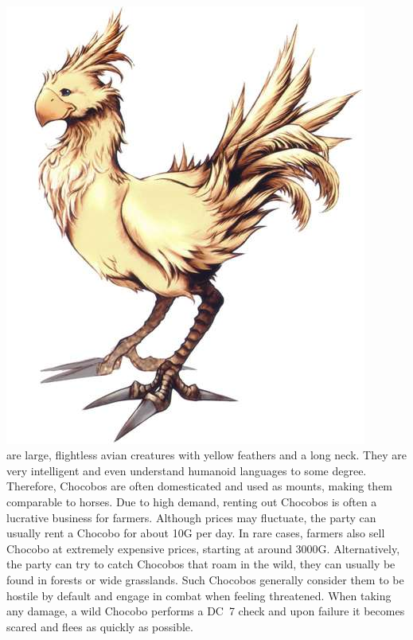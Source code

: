 %

\\
%
\includegraphics[width=0.95\columnwidth]{./art/chocobo/chocobo.jpg}
%
\\
%
%
 are large, flightless avian creatures with yellow feathers and a long neck.
They are very intelligent and even understand humanoid languages to some degree.
Therefore, Chocobos are often domesticated and used as mounts, making them comparable to horses.
Due to high demand, renting out Chocobos is often a lucrative business for farmers.
Although prices may fluctuate, the party can usually rent a Chocobo for about 10G per day.
In rare cases, farmers also sell Chocobo at extremely expensive prices, starting at around 3000G. 
Alternatively, the party can try to catch Chocobos that roam in the wild, they can usually be found in forests or wide grasslands.
Such Chocobos generally consider them to be hostile by default and engage in combat when feeling threatened.
When taking any damage, a wild Chocobo performs a DC~7 check and upon failure it becomes scared and flees as quickly as possible.
